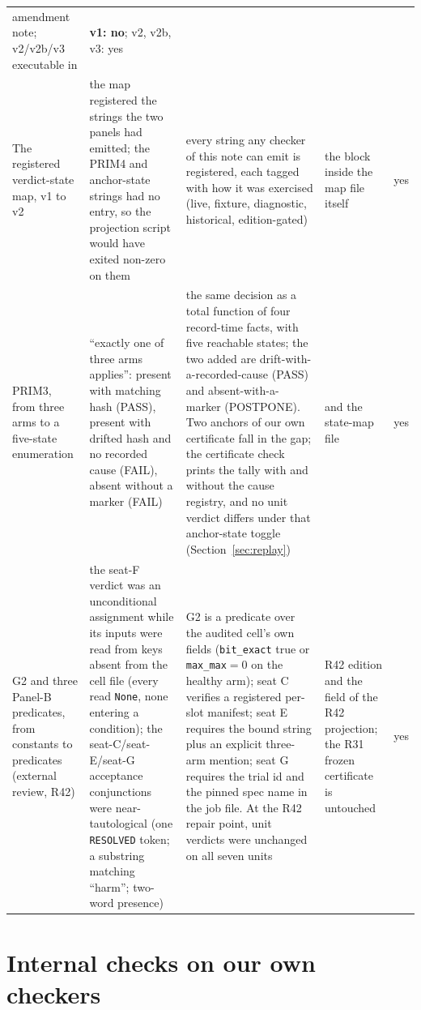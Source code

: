 \documentclass{article}
\begin{document}
{\begin{longtable}{@{}Q{72pt} Q{102pt} Q{102pt} Q{55pt} Q{42pt}@{}}
    amendment note; v2/v2b/v3 executable in 
  & \textbf{v1: no}; v2, v2b, v3: yes \\
\addlinespace[3pt]
The registered verdict-state map, v1 to v2
  & the map registered the strings the two panels had emitted; the PRIM4 and anchor-state
    strings had no entry, so the projection script would have exited non-zero on them
  & every string any checker of this note can emit is registered, each tagged with how it
    was exercised (live, fixture, diagnostic, historical, edition-gated)
  & the  block inside the map file itself & yes \\
\addlinespace[3pt]
PRIM3, from three arms to a five-state enumeration
  & ``exactly one of three arms applies'': present with matching hash (PASS), present with
    drifted hash and no recorded cause (FAIL), absent without a marker (FAIL)
  & the same decision as a total function of four record-time facts, with five reachable
    states; the two added are drift-with-a-recorded-cause (PASS) and absent-with-a-marker
    (POSTPONE). Two anchors of our own certificate fall in the gap; the certificate check
    prints the tally with and without the cause registry, and no unit verdict differs under
    that anchor-state toggle (Section~\ref{sec:replay})
  &  and the state-map file & yes \\
\addlinespace[3pt]
G2 and three Panel-B predicates, from constants to predicates (external review, R42)
  & the seat-F verdict was an unconditional assignment while its inputs were read from keys
    absent from the cell file (every read \texttt{None}, none entering a condition); the
    seat-C/seat-E/seat-G acceptance conjunctions were near-tautological (one \texttt{RESOLVED} token;
    a substring matching ``harm''; two-word presence)
  & G2 is a predicate over the audited cell's own fields (\texttt{bit\_exact} true or
    \texttt{max\_max}${}=0$ on the healthy arm); seat C verifies a registered per-slot
    manifest; seat E requires the bound string plus an explicit three-arm mention; seat G requires
    the trial id and the pinned spec name in the job file. At the R42 repair point, unit
    verdicts were unchanged on all seven units
  &  R42 edition and the
     field of the R42 projection; the R31 frozen certificate is
    untouched & yes \\
\end{longtable}
}

\section{Internal checks on our own checkers}
\label{app:internal}
\end{document}
